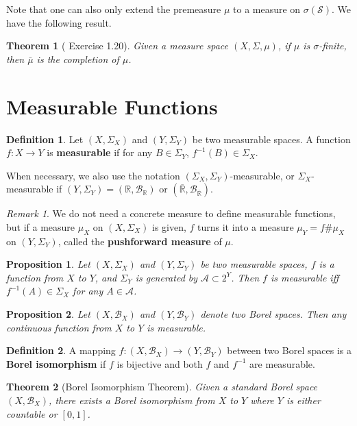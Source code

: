 \documentclass[openany]{book}
\newtheorem{proposition}{Proposition}[chapter]
\newtheorem{theorem}{Theorem}[chapter]
\theoremstyle{definition}
\newtheorem{definition}{Definition}[chapter]
\theoremstyle{remark}
\newtheorem*{remark}{Remark}
\begin{document}
Note that one can also only extend the premeasure $\mu$ to a measure on $\sigma(\mathcal{S})$. We have the following result.
\begin{theorem}[\cite{F13} Exercise 1.20]
    Given a measure space $(X,\Sigma,\mu)$, if $\mu$ is $\sigma$-finite, then $\bar{\mu}$ is the completion of $\mu$.
\end{theorem}

\section{Measurable Functions}
\begin{definition}
    Let $(X,\Sigma_X)$ and $(Y,\Sigma_Y)$ be two measurable spaces. A function $f:X\rightarrow Y$ is \textbf{measurable} if for any $B\in\Sigma_Y$, $f^{-1}(B)\in\Sigma_X$.

    When necessary, we also use the notation $(\Sigma_X,\Sigma_Y)$-measurable, or $\Sigma_X$-measurable if $(Y,\Sigma_Y)=(\mathbb{R},\mathcal{B}_{\mathbb{R}})$ or $(\overline{\mathbb{R}},\mathcal{B}_{\overline{\mathbb{R}}})$.
\end{definition}
\begin{remark}
    We do not need a concrete measure to define measurable functions, but if a measure $\mu_X$ on $(X,\Sigma_X)$ is given, $f$ turns it into a measure $\mu_Y=f\#\mu_X$ on $(Y,\Sigma_Y)$, called the \textbf{pushforward measure} of $\mu$.
\end{remark}
\begin{proposition}
    Let $(X,\Sigma_X)$ and $(Y,\Sigma_Y)$ be two measurable spaces, $f$ is a function from $X$ to $Y$, and $\Sigma_Y$ is generated by $\mathcal{A}\subset2^Y$. Then $f$ is measurable iff $f^{-1}(A)\in\Sigma_X$ for any $A\in \mathcal{A}$.
\end{proposition}
\begin{proposition}
    Let $(X,\mathcal{B}_X)$ and $(Y,\mathcal{B}_Y)$ denote two Borel spaces. Then any continuous function from $X$ to $Y$ is measurable.
\end{proposition}
\begin{definition}
    A mapping $f:(X,\mathcal{B}_X)\to (Y,\mathcal{B}_Y)$ between two Borel spaces is a \textbf{Borel isomorphism} if $f$ is bijective and both $f$ and $f^{-1}$ are measurable.
\end{definition}
\begin{theorem}[Borel Isomorphism Theorem]
    Given a standard Borel space $(X,\mathcal{B}_X)$, there exists a Borel isomorphism from $X$ to $Y$ where $Y$ is either countable or $[0,1]$.
\end{theorem}
\end{document}
